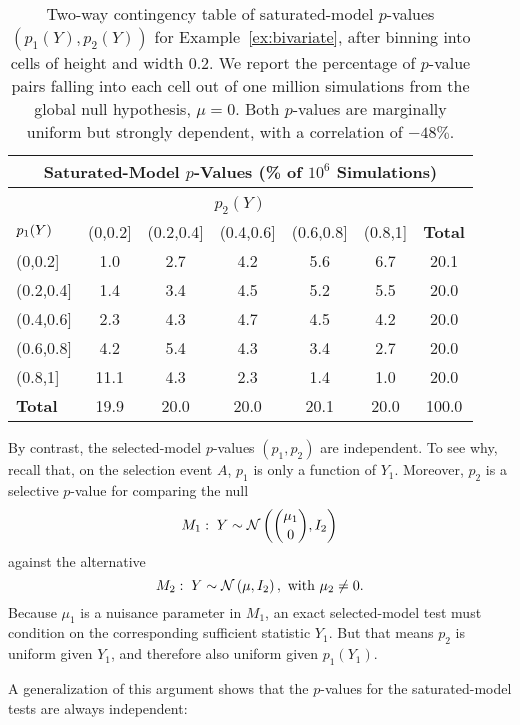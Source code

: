 \documentclass{article}
\begin{document}
\begin{table}[ht]
  \centering
  \begin{tabular}{l|ccccc|c}
    \multicolumn{7}{c}{Saturated-Model $p$-Values 
      (\% of $10^6$ Simulations)}\\[7pt]
    \hline
    \multicolumn{7}{c}{}\\[-1.5ex]
    \multicolumn{7}{c}{$p_2(Y)$}\\[5pt]
    ${\large p_1(Y)}$ & (0,0.2] & (0.2,0.4] & (0.4,0.6] & (0.6,0.8] & (0.8,1] & \textbf{Total} \\ 
    \hline
    (0,0.2] & 1.0 & 2.7 & 4.2 & 5.6 & 6.7 & 20.1 \\ 
    (0.2,0.4] & 1.4 & 3.4 & 4.5 & 5.2 & 5.5 & 20.0 \\ 
    (0.4,0.6] & 2.3 & 4.3 & 4.7 & 4.5 & 4.2 & 20.0 \\ 
    (0.6,0.8] & 4.2 & 5.4 & 4.3 & 3.4 & 2.7 & 20.0 \\ 
    (0.8,1] & 11.1 & 4.3 & 2.3 & 1.4 & 1.0 & 20.0 \\ 
    \hline
    \textbf{Total} & 19.9 & 20.0 & 20.0 & 20.1 & 20.0 & 100.0 \\ 
    \hline
  \end{tabular}
  \caption{Two-way contingency table of saturated-model $p$-values $(p_1(Y), p_2(Y))$ for Example~\ref{ex:bivariate}, after binning into cells of height and width 0.2. We report the percentage of $p$-value pairs falling into each cell out of one million simulations from the global null hypothesis, $\mu=0$. Both $p$-values are marginally uniform but strongly dependent, with a correlation of $-48\%$.}
\label{tab:bv_twoWayTable}
\end{table}

By contrast, the selected-model $p$-values $(p_1,p_2)$ are independent. To see why, recall that, on the selection event $A$, $p_1$ is only a function of $Y_1$. Moreover, $p_2$ is a selective $p$-value for comparing the null
\[
M_1:\; Y \sim \mathcal{N}\left(\binom{\mu_1}{0}, I_2\right)
\]
against the alternative
\[
M_2:\; Y \sim \mathcal{N}\left(\mu, I_2\right), \text{ with } \mu_2 \neq 0.
\]
Because $\mu_1$ is a nuisance parameter in $M_1$, an exact selected-model test must condition on the corresponding sufficient statistic $Y_1$. But that means $p_2$ is uniform given $Y_1$, and therefore also uniform given $p_1(Y_1)$.

A generalization of this argument shows that the $p$-values for the saturated-model tests are always independent:
\end{document}
